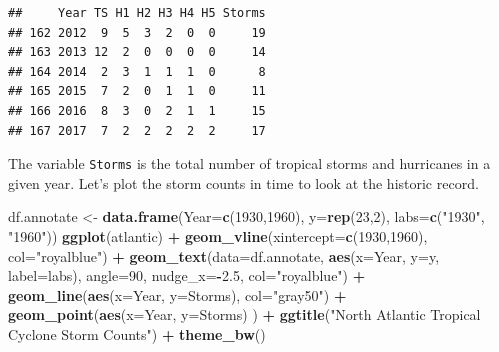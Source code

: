 \documentclass[
]{book}
\newenvironment{Shaded}{\begin{snugshade}}{\end{snugshade}}
\newcommand{\AttributeTok}[1]{\textcolor[rgb]{0.13,0.29,0.53}{#1}}
\newcommand{\DecValTok}[1]{\textcolor[rgb]{0.00,0.00,0.81}{#1}}
\newcommand{\FloatTok}[1]{\textcolor[rgb]{0.00,0.00,0.81}{#1}}
\newcommand{\FunctionTok}[1]{\textcolor[rgb]{0.13,0.29,0.53}{\textbf{#1}}}
\newcommand{\NormalTok}[1]{#1}
\newcommand{\OtherTok}[1]{\textcolor[rgb]{0.56,0.35,0.01}{#1}}
\newcommand{\SpecialCharTok}[1]{\textcolor[rgb]{0.81,0.36,0.00}{\textbf{#1}}}
\newcommand{\StringTok}[1]{\textcolor[rgb]{0.31,0.60,0.02}{#1}}
\begin{document}
\begin{verbatim}
##     Year TS H1 H2 H3 H4 H5 Storms
## 162 2012  9  5  3  2  0  0     19
## 163 2013 12  2  0  0  0  0     14
## 164 2014  2  3  1  1  1  0      8
## 165 2015  7  2  0  1  1  0     11
## 166 2016  8  3  0  2  1  1     15
## 167 2017  7  2  2  2  2  2     17
\end{verbatim}

The variable \texttt{Storms} is the total number of tropical storms and hurricanes in a given year.
Let's plot the storm counts in time to look at the historic record.

\begin{Shaded}
\begin{Highlighting}[]
\NormalTok{df.annotate }\OtherTok{\textless{}{-}} \FunctionTok{data.frame}\NormalTok{(}\AttributeTok{Year=}\FunctionTok{c}\NormalTok{(}\DecValTok{1930}\NormalTok{,}\DecValTok{1960}\NormalTok{),}
                          \AttributeTok{y=}\FunctionTok{rep}\NormalTok{(}\DecValTok{23}\NormalTok{,}\DecValTok{2}\NormalTok{),}
                          \AttributeTok{labs=}\FunctionTok{c}\NormalTok{(}\StringTok{"1930"}\NormalTok{, }\StringTok{"1960"}\NormalTok{))}
\FunctionTok{ggplot}\NormalTok{(atlantic) }\SpecialCharTok{+}
  \FunctionTok{geom\_vline}\NormalTok{(}\AttributeTok{xintercept=}\FunctionTok{c}\NormalTok{(}\DecValTok{1930}\NormalTok{,}\DecValTok{1960}\NormalTok{), }\AttributeTok{col=}\StringTok{"royalblue"}\NormalTok{) }\SpecialCharTok{+} 
  \FunctionTok{geom\_text}\NormalTok{(}\AttributeTok{data=}\NormalTok{df.annotate, }\FunctionTok{aes}\NormalTok{(}\AttributeTok{x=}\NormalTok{Year, }\AttributeTok{y=}\NormalTok{y, }\AttributeTok{label=}\NormalTok{labs), }\AttributeTok{angle=}\DecValTok{90}\NormalTok{, }\AttributeTok{nudge\_x=}\SpecialCharTok{{-}}\FloatTok{2.5}\NormalTok{, }\AttributeTok{col=}\StringTok{"royalblue"}\NormalTok{) }\SpecialCharTok{+}
  \FunctionTok{geom\_line}\NormalTok{(}\FunctionTok{aes}\NormalTok{(}\AttributeTok{x=}\NormalTok{Year, }\AttributeTok{y=}\NormalTok{Storms), }\AttributeTok{col=}\StringTok{"gray50"}\NormalTok{) }\SpecialCharTok{+}
  \FunctionTok{geom\_point}\NormalTok{(}\FunctionTok{aes}\NormalTok{(}\AttributeTok{x=}\NormalTok{Year, }\AttributeTok{y=}\NormalTok{Storms) ) }\SpecialCharTok{+}
  \FunctionTok{ggtitle}\NormalTok{(}\StringTok{"North Atlantic Tropical Cyclone Storm Counts"}\NormalTok{) }\SpecialCharTok{+}
  \FunctionTok{theme\_bw}\NormalTok{()}
\end{Highlighting}
\end{Shaded}
\end{document}

